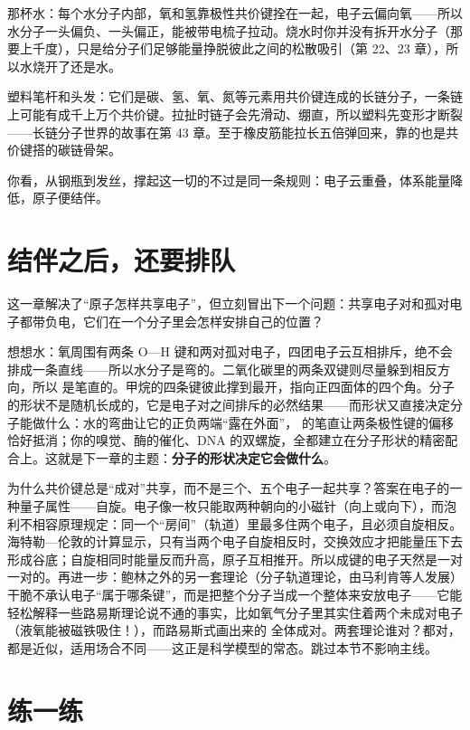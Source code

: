那杯水：每个水分子内部，氧和氢靠极性共价键拴在一起，电子云偏向氧——所以水分子一头偏负、一头偏正，能被带电梳子拉动。烧水时你并没有拆开水分子（那要上千度），只是给分子们足够能量挣脱彼此之间的松散吸引（第 22、23 章），所以水烧开了还是水。

塑料笔杆和头发：它们是碳、氢、氧、氮等元素用共价键连成的长链分子，一条链上可能有成千上万个共价键。拉扯时链子会先滑动、绷直，所以塑料先变形才断裂——长链分子世界的故事在第 43 章。至于橡皮筋能拉长五倍弹回来，靠的也是共价键搭的碳链骨架。

你看，从钢瓶到发丝，撑起这一切的不过是同一条规则：电子云重叠，体系能量降低，原子便结伴。

\section{结伴之后，还要排队}

这一章解决了“原子怎样共享电子”，但立刻冒出下一个问题：共享电子对和孤对电子都带负电，它们在一个分子里会怎样安排自己的位置？

想想水：氧周围有两条 O—H 键和两对孤对电子，四团电子云互相排斥，绝不会排成一条直线——所以水分子是弯的。二氧化碳里的两条双键则尽量躲到相反方向，所以  是笔直的。甲烷的四条键彼此撑到最开，指向正四面体的四个角。分子的形状不是随机长成的，它是电子对之间排斥的必然结果——而形状又直接决定分子能做什么：水的弯曲让它的正负两端“露在外面”，  的笔直让两条极性键的偏移恰好抵消；你的嗅觉、酶的催化、DNA 的双螺旋，全都建立在分子形状的精密配合上。这就是下一章的主题：\textbf{分子的形状决定它会做什么}。

\begin{tiaozhan}
为什么共价键总是“成对”共享，而不是三个、五个电子一起共享？答案在电子的一种量子属性——自旋。电子像一枚只能取两种朝向的小磁针（向上或向下），而泡利不相容原理规定：同一个“房间”（轨道）里最多住两个电子，且必须自旋相反。海特勒—伦敦的计算显示，只有当两个电子自旋相反时，交换效应才把能量压下去形成谷底；自旋相同时能量反而升高，原子互相推开。所以成键的电子天然是一对一对的。再进一步：鲍林之外的另一套理论（分子轨道理论，由马利肯等人发展）干脆不承认电子“属于哪条键”，而是把整个分子当成一个整体来安放电子——它能轻松解释一些路易斯理论说不通的事实，比如氧气分子里其实住着两个未成对电子（液氧能被磁铁吸住！），而路易斯式画出来的  全体成对。两套理论谁对？都对，都是近似，适用场合不同——这正是科学模型的常态。跳过本节不影响主线。
\end{tiaozhan}

\section*{练一练}

